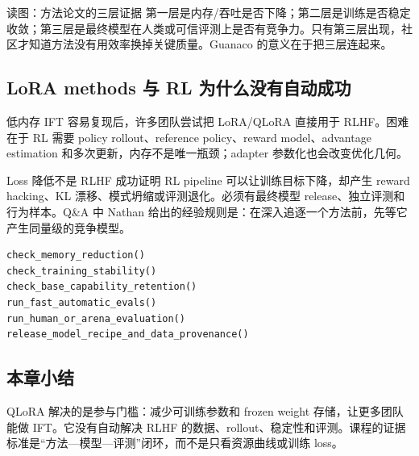 
\begin{knowledgebox}{读图：方法论文的三层证据}
第一层是内存/吞吐是否下降；第二层是训练是否稳定收敛；第三层是最终模型在人类或可信评测上是否有竞争力。只有第三层出现，社区才知道方法没有用效率换掉关键质量。Guanaco 的意义在于把三层连起来。
\end{knowledgebox}


\subsection{LoRA methods 与 RL 为什么没有自动成功}

低内存 IFT 容易复现后，许多团队尝试把 LoRA/QLoRA 直接用于 RLHF。困难在于 RL 需要 policy rollout、reference policy、reward model、advantage estimation 和多次更新，内存不是唯一瓶颈；adapter 参数化也会改变优化几何。


\begin{warningbox}{Loss 降低不是 RLHF 成功证明}
RL pipeline 可以让训练目标下降，却产生 reward hacking、KL 漂移、模式坍缩或评测退化。必须有最终模型 release、独立评测和行为样本。Q\&A 中 Nathan 给出的经验规则是：在深入追逐一个方法前，先等它产生同量级的竞争模型。
\end{warningbox}


\begin{lstlisting}[caption={从效率方法到可信模型发布的验证门}]
check_memory_reduction()
check_training_stability()
check_base_capability_retention()
run_fast_automatic_evals()
run_human_or_arena_evaluation()
release_model_recipe_and_data_provenance()
\end{lstlisting}

\subsection{本章小结}

QLoRA 解决的是参与门槛：减少可训练参数和 frozen weight 存储，让更多团队能做 IFT。它没有自动解决 RLHF 的数据、rollout、稳定性和评测。课程的证据标准是“方法—模型—评测”闭环，而不是只看资源曲线或训练 loss。

